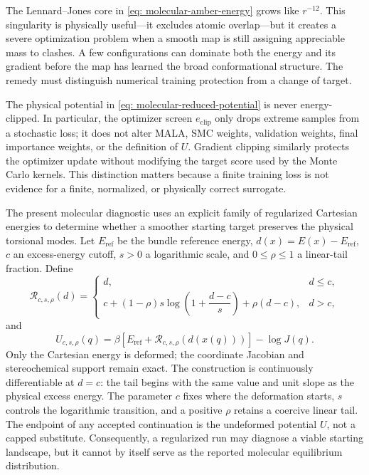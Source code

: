 \documentclass{article}
\begin{document}
The Lennard--Jones core in \eqref{eq: molecular-amber-energy} grows like \(r^{-12}\). This singularity is physically useful---it excludes atomic overlap---but it creates a severe optimization problem when a smooth map is still assigning appreciable mass to clashes. A few configurations can dominate both the energy and its gradient before the map has learned the broad conformational structure. The remedy must distinguish numerical training protection from a change of target.

The physical potential in \eqref{eq: molecular-reduced-potential} is never energy-clipped. In particular, the optimizer screen \(e_{\mathrm{clip}}\) only drops extreme samples from a stochastic loss; it does not alter MALA, SMC weights, validation weights, final importance weights, or the definition of \(U\). Gradient clipping similarly protects the optimizer update without modifying the target score used by the Monte Carlo kernels. This distinction matters because a finite training loss is not evidence for a finite, normalized, or physically correct surrogate.

The present molecular diagnostic uses an explicit family of regularized Cartesian energies to determine whether a smoother starting target preserves the physical torsional modes. Let \(E_{\mathrm{ref}}\) be the bundle reference energy, \(d(x)=E(x)-E_{\mathrm{ref}}\), \(c\) an excess-energy cutoff, \(s>0\) a logarithmic scale, and \(0\leq\rho\leq1\) a linear-tail fraction. Define
\begin{equation}
\mathcal R_{c,s,\rho}(d)=
\begin{cases}
d, & d\leq c,\\[2pt]
c+(1-\rho)s\log\!\left(1+\dfrac{d-c}{s}\right)+\rho(d-c), & d>c,
\end{cases}
\label{eq: molecular-regularizer}
\end{equation}
and
\begin{equation}
U_{c,s,\rho}(q)
=\beta\!\left[E_{\mathrm{ref}}+\mathcal R_{c,s,\rho}(d(x(q)))\right]-\log J(q).
\label{eq: regularized-molecular-potential}
\end{equation}
Only the Cartesian energy is deformed; the coordinate Jacobian and stereochemical support remain exact. The construction is continuously differentiable at \(d=c\): the tail begins with the same value and unit slope as the physical excess energy. The parameter \(c\) fixes where the deformation starts, \(s\) controls the logarithmic transition, and a positive \(\rho\) retains a coercive linear tail. The endpoint of any accepted continuation is the undeformed potential \(U\), not a capped substitute. Consequently, a regularized run may diagnose a viable starting landscape, but it cannot by itself serve as the reported molecular equilibrium distribution.
\end{document}
